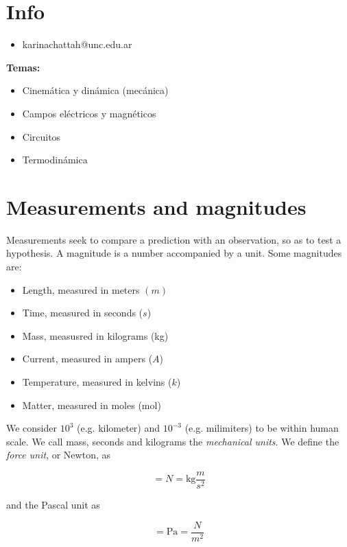 \documentclass[12pt]{article}
\theoremstyle{definition}
\begin{document}
\section{Info}

\begin{itemize}
    \item karinachattah@unc.edu.ar
\end{itemize}

\textbf{Temas:}

\begin{itemize}
    \item Cinemática y dinámica (mecánica)
    \item Campos eléctricos y magnéticos
    \item Circuitos 
    \item Termodinámica
\end{itemize}

\section{Measurements and magnitudes}

Measurements seek to compare a prediction with an observation, so as to test a
hypothesis. A magnitude is a number accompanied by a unit. Some magnitudes are: 

\begin{itemize}
    \item Length, measured in meters $(m)$
    \item Time, measured in seconds ($s$)
    \item  Mass, measusred in kilograms (kg)
    \item Current, measured in ampers ($A$)
    \item Temperature, measured in kelvins ($k$)
    \item Matter, measured in moles (mol)
\end{itemize}

We consider $10^3$ (e.g. kilometer) and $10^{-3}$ (e.g. milimiters) to be within
human scale.  We call mass, seconds and kilograms the \textit{mechanical units}.
We define the \textit{force unit}, or Newton, as

\begin{equation*}
    [F] = N = \text{kg} \frac{m}{s^2}
\end{equation*}

and the Pascal unit as 

\begin{equation*}
    [P] = \text{Pa} = \frac{N}{m^2}
\end{equation*}
\end{document}
